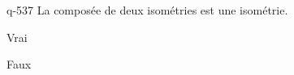 \begin{truefalse}{q-537}
La composée de deux isométries est une isométrie.
\item* Vrai
\item Faux
\end{truefalse}


